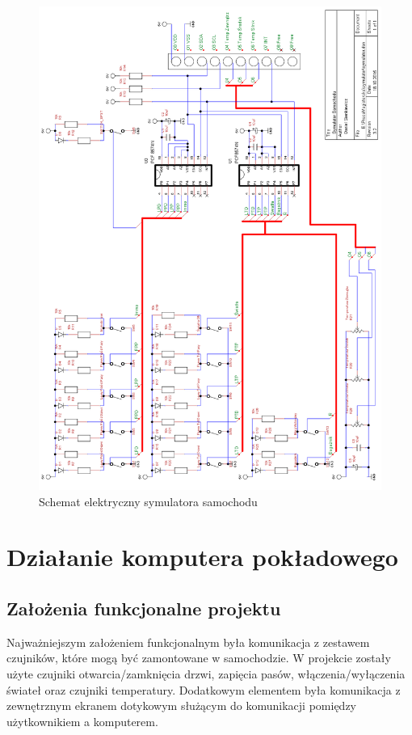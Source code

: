 \documentclass{xmgr}
\begin{document}
\begin{figure}[!p]
    \centering
    	\includegraphics[height=0.9\textheight]{images/symulator.png}
    \caption{Schemat elektryczny symulatora samochodu}
\end{figure}
\chapter{Działanie komputera pokładowego}
\section{Założenia funkcjonalne projektu}
Najważniejszym założeniem funkcjonalnym była komunikacja z zestawem czujników, które mogą być zamontowane w samochodzie. W projekcie zostały użyte czujniki otwarcia/zamknięcia drzwi, zapięcia pasów, włączenia/wyłączenia świateł oraz czujniki temperatury. Dodatkowym elementem była komunikacja z zewnętrznym ekranem dotykowym służącym do komunikacji pomiędzy użytkownikiem a komputerem.
\end{document}
